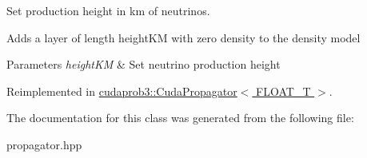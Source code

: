Set production height in km of neutrinos. 

Adds a layer of length height\+KM with zero density to the density model 
\begin{DoxyParams}{Parameters}
{\em height\+KM} & Set neutrino production height \\
\hline
\end{DoxyParams}


Reimplemented in \hyperlink{classcudaprob3_1_1CudaPropagator_ad639f2aa32a548b74a9a9c82d498b24a}{cudaprob3\+::\+Cuda\+Propagator$<$ F\+L\+O\+A\+T\+\_\+\+T $>$}.



The documentation for this class was generated from the following file\+:\begin{DoxyCompactItemize}
\item 
propagator.\+hpp\end{DoxyCompactItemize}
